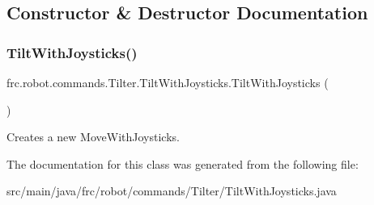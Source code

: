 \subsection{Constructor \& Destructor Documentation}
\mbox{\label{classfrc_1_1robot_1_1commands_1_1_tilter_1_1_tilt_with_joysticks_a2200a7019aae0e99568ab465db6151e6}} 
\subsubsection{\texorpdfstring{TiltWithJoysticks()}{TiltWithJoysticks()}}
{\footnotesize\ttfamily frc.\+robot.\+commands.\+Tilter.\+Tilt\+With\+Joysticks.\+Tilt\+With\+Joysticks (\begin{DoxyParamCaption}{ }\end{DoxyParamCaption})\hspace{0.3cm}{\ttfamily [inline]}}

Creates a new Move\+With\+Joysticks. 

The documentation for this class was generated from the following file\+:\begin{DoxyCompactItemize}
\item 
src/main/java/frc/robot/commands/\+Tilter/Tilt\+With\+Joysticks.\+java\end{DoxyCompactItemize}
